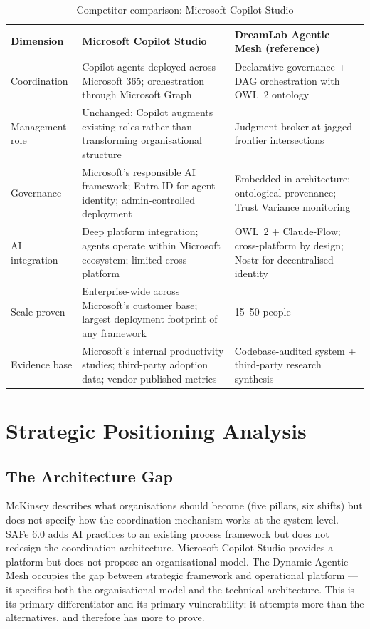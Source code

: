 \begin{table}[H]
\centering
\caption{Competitor comparison: Microsoft Copilot Studio}
\label{tab:competitor-matrix-3}
\footnotesize
\begin{tabularx}{\textwidth}{L{2cm} X X}
\toprule
\textbf{Dimension} & \textbf{Microsoft Copilot Studio} & \textbf{DreamLab Agentic Mesh (reference)} \\
\midrule
Coordination & Copilot agents deployed across Microsoft 365; orchestration through Microsoft Graph & Declarative governance + DAG orchestration with OWL~2 ontology \\
\addlinespace
Management role & Unchanged; Copilot augments existing roles rather than transforming organisational structure & Judgment broker at jagged frontier intersections \\
\addlinespace
Governance & Microsoft's responsible AI framework; Entra ID for agent identity; admin-controlled deployment & Embedded in architecture; ontological provenance; Trust Variance monitoring \\
\addlinespace
AI integration & Deep platform integration; agents operate within Microsoft ecosystem; limited cross-platform & OWL~2 + Claude-Flow; cross-platform by design; Nostr for decentralised identity \\
\addlinespace
Scale proven & Enterprise-wide across Microsoft's customer base; largest deployment footprint of any framework & 15--50 people \\
\addlinespace
Evidence base & Microsoft's internal productivity studies; third-party adoption data; vendor-published metrics & Codebase-audited system + third-party research synthesis \\
\bottomrule
\end{tabularx}
\end{table}

\section{Strategic Positioning Analysis}

\subsection{The Architecture Gap}

McKinsey describes what organisations should become (five pillars, six shifts) but does not specify how the coordination mechanism works at the system level. SAFe 6.0 adds AI practices to an existing process framework but does not redesign the coordination architecture. Microsoft Copilot Studio provides a platform but does not propose an organisational model. The Dynamic Agentic Mesh occupies the gap between strategic framework and operational platform --- it specifies both the organisational model and the technical architecture. This is its primary differentiator and its primary vulnerability: it attempts more than the alternatives, and therefore has more to prove.


